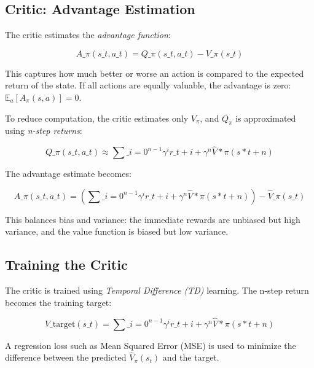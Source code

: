 \documentclass[a4paper,oneside]{book}
\theoremstyle{definition}
\begin{document}
\subsection{Critic: Advantage Estimation}

The critic estimates the \textit{advantage function}:

\begin{equation}
A\_\pi(s\_t, a\_t) = Q\_\pi(s\_t, a\_t) - V\_\pi(s\_t)
\label{eq\:advantage\_function}
\end{equation}

This captures how much better or worse an action is compared to the expected return of the state. If all actions are equally valuable, the advantage is zero: $\mathbb{E}_a [A_\pi(s, a)] = 0$.

To reduce computation, the critic estimates only $V_\pi$, and $Q_\pi$ is approximated using \textit{n-step returns}:

\begin{equation}
Q\_\pi(s\_t, a\_t) \approx \sum\_{i=0}^{n-1} \gamma^i r\_{t+i} + \gamma^n \hat{V}*\pi(s*{t+n})
\label{eq\:n\_step\_return}
\end{equation}

The advantage estimate becomes:

\begin{equation}
A\_\pi(s\_t, a\_t) = \left( \sum\_{i=0}^{n-1} \gamma^i r\_{t+i} + \gamma^n \hat{V}*\pi(s*{t+n}) \right) - \hat{V}\_\pi(s\_t)
\label{eq\:advantage\_estimate}
\end{equation}

This balances bias and variance: the immediate rewards are unbiased but high variance, and the value function is biased but low variance.

\subsection{Training the Critic}

The critic is trained using \textit{Temporal Difference (TD)} learning. The n-step return becomes the training target:

\begin{equation}
V\_{\text{target}}(s\_t) = \sum\_{i=0}^{n-1} \gamma^i r\_{t+i} + \gamma^n \hat{V}*\pi(s*{t+n})
\label{eq\:td\_target}
\end{equation}

A regression loss such as Mean Squared Error (MSE) is used to minimize the difference between the predicted $\hat{V}_\pi(s_t)$ and the target.
\end{document}
